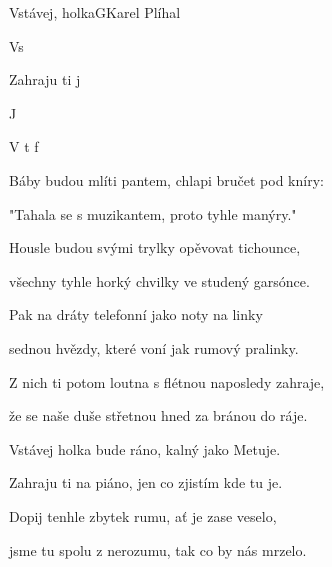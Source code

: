 \setcounter{page}{99}
\begin{song}{Vstávej, holka}{G}{Karel Plíhal}

\begin{SBVerse}

Vs 

   Zahraju ti   j

   J  

   V t  f

\end{SBVerse}

\begin{SBVerse}

Báby budou mlíti pantem, chlapi bručet pod kníry:

   "Tahala se s muzikantem, proto tyhle manýry."

   Housle budou svými trylky opěvovat tichounce,

   všechny tyhle horký chvilky ve studený garsónce.

\end{SBVerse}

\begin{SBVerse}

Pak na dráty telefonní jako noty na linky

   sednou hvězdy, které voní jak rumový pralinky.

   Z nich ti potom loutna s flétnou naposledy zahraje,

   že se naše duše střetnou hned za bránou do ráje.

\end{SBVerse}

\begin{SBVerse}

Vstávej holka bude ráno, kalný jako Metuje.

   Zahraju ti na piáno, jen co zjistím kde tu je.

   Dopij tenhle zbytek rumu, ať je zase veselo,

   jsme tu spolu z nerozumu, tak co by nás mrzelo.

\end{SBVerse}

\end{song}

\pagebreak
